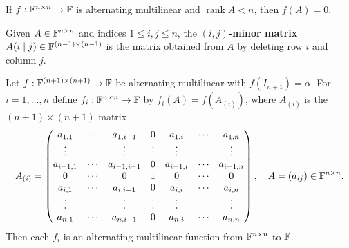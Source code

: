 \begin{corbox}
If $f:\mathbb{F}^{n\times n}\to\mathbb{F}$ is alternating multilinear and
$\operatorname{rank}A < n$, then $f(A)=0$.
\end{corbox}

\begin{defbox}
\label{def:submatrix}
Given $A\in\mathbb{F}^{n\times n}$ and indices $1\le i,j\le n$, the
\textbf{$(i,j)$-minor matrix} $A(i\mid j)\in\mathbb{F}^{(n-1)\times(n-1)}$
is the matrix obtained from $A$ by deleting row $i$ and column $j$.
\end{defbox}

\begin{thmbox}
\label{lem:dim-reduction}
Let $f:\mathbb{F}^{(n+1)\times(n+1)}\to\mathbb{F}$ be alternating multilinear with
$f(I_{n+1})=\alpha$.  For $i=1,\ldots,n$ define
$f_i:\mathbb{F}^{n\times n}\to\mathbb{F}$ by $f_i(A)=f(A_{(i)})$, where $A_{(i)}$ is
the $(n+1)\times(n+1)$ matrix
\[
    A_{(i)} =
    \begin{pmatrix}
        a_{1,1}&\cdots&a_{1,i-1}&0&a_{1,i}&\cdots&a_{1,n}\\
        \vdots & & \vdots & \vdots & \vdots & & \vdots \\
        a_{i-1,1}&\cdots&a_{i-1,i-1}&0&a_{i-1,i}&\cdots&a_{i-1,n}\\
        0&\cdots&0&1&0&\cdots&0\\
        a_{i,1}&\cdots&a_{i,i-1}&0&a_{i,i}&\cdots&a_{i,n}\\
        \vdots & & \vdots & \vdots & \vdots & & \vdots \\
        a_{n,1}&\cdots&a_{n,i-1}&0&a_{n,i}&\cdots&a_{n,n}
    \end{pmatrix},
    \quad A=(a_{ij})\in\mathbb{F}^{n\times n}.
\]
Then each $f_i$ is an alternating multilinear function from
$\mathbb{F}^{n\times n}$ to $\mathbb{F}$.
\end{thmbox}

